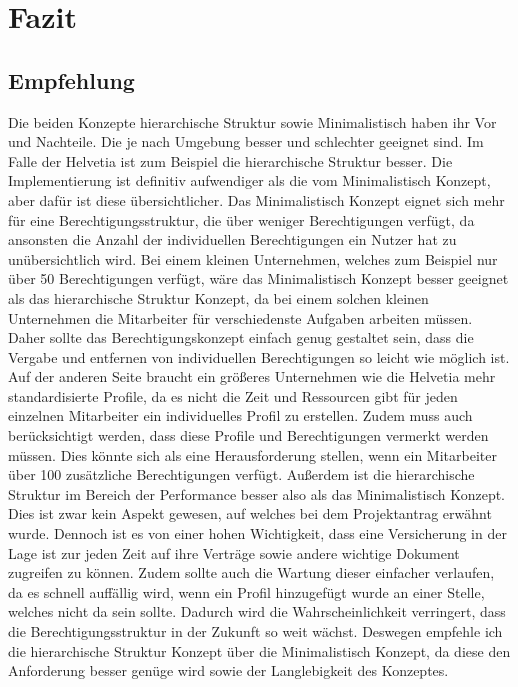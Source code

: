 \chapter{Fazit}
\label{ch:chapter06}

\section{Empfehlung}
\label{sec:chapter06}
Die beiden Konzepte hierarchische Struktur sowie Minimalistisch haben ihr Vor und Nachteile.
Die je nach Umgebung besser und schlechter geeignet sind.
Im Falle der Helvetia ist zum Beispiel die hierarchische Struktur besser.
\newline
Die Implementierung ist definitiv aufwendiger als die vom Minimalistisch Konzept, aber dafür ist diese übersichtlicher.
Das Minimalistisch Konzept eignet sich mehr für eine Berechtigungsstruktur, die über weniger Berechtigungen verfügt, da ansonsten die Anzahl der individuellen Berechtigungen ein Nutzer hat zu unübersichtlich wird.
Bei einem kleinen Unternehmen, welches zum Beispiel nur über 50 Berechtigungen verfügt, wäre das Minimalistisch Konzept besser geeignet als das hierarchische Struktur Konzept, da bei einem solchen kleinen Unternehmen die Mitarbeiter für verschiedenste Aufgaben arbeiten müssen.
Daher sollte das Berechtigungskonzept einfach genug gestaltet sein, dass die Vergabe und entfernen von individuellen Berechtigungen so leicht wie möglich ist.
Auf der anderen Seite braucht ein größeres Unternehmen wie die Helvetia mehr standardisierte Profile, da es nicht die Zeit und Ressourcen gibt für jeden einzelnen Mitarbeiter ein individuelles Profil zu erstellen.
Zudem muss auch berücksichtigt werden, dass diese Profile und Berechtigungen vermerkt werden müssen.
Dies könnte sich als eine Herausforderung stellen, wenn ein Mitarbeiter über 100 zusätzliche Berechtigungen verfügt.
\newline
Außerdem ist die hierarchische Struktur im Bereich der Performance besser also als das Minimalistisch Konzept.
Dies ist zwar kein Aspekt gewesen, auf welches bei dem Projektantrag erwähnt wurde.
Dennoch ist es von einer hohen Wichtigkeit, dass eine Versicherung in der Lage ist zur jeden Zeit auf ihre Verträge sowie andere wichtige Dokument zugreifen zu können.
\newline
Zudem sollte auch die Wartung dieser einfacher verlaufen, da es schnell auffällig wird, wenn ein Profil hinzugefügt wurde an einer Stelle, welches nicht da sein sollte.
Dadurch wird die Wahrscheinlichkeit verringert, dass die Berechtigungsstruktur in der Zukunft so weit wächst.
Deswegen empfehle ich die hierarchische Struktur Konzept über die Minimalistisch Konzept, da diese den Anforderung besser genüge wird sowie der Langlebigkeit des Konzeptes.
\newpage

